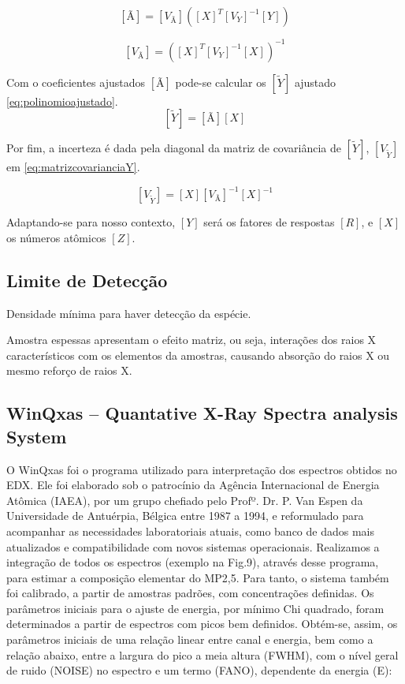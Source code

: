 \begin{equation}
  \label{eq:coeficientesajustados}
  [Ã] = [V_{Ã}] ([X]^T {[V_Y]}^{-1} [Y])
\end{equation}

\begin{equation}
  \label{eq:matrizcovariancia}
  [V_{Ã}] = ([X]^T [V_Y]^{-1} [X])^{-1}
\end{equation}

Com o coeficientes ajustados $[Ã]$ pode-se calcular os $[\tilde{Y}]$ ajustado \ref{eq:polinomioajustado}.
\begin{equation}
  \label{eq:polinomioajustado}
  [\tilde{Y}] = [Ã][X]
\end{equation}

Por fim, a incerteza é dada pela diagonal da matriz de covariância de $[\tilde{Y}]$, 
$[V_{\tilde{Y}}]$ em \ref{eq:matrizcovarianciaY}.

\begin{equation}
  \label{eq:matrizcovarianciaY}
  [V_{\tilde{Y}}] = [X] [V_{Ã}]^{-1} [X]^{-1}
\end{equation}

Adaptando-se para nosso contexto, $[Y]$ será os fatores de respostas $[R]$,
e $[X]$ os números atômicos $[Z]$.

\subsection{Limite de Detecção}

Densidade mínima para haver detecção da espécie. %

Amostra espessas apresentam o efeito matriz, ou seja, interações dos 
raios X característicos com os elementos da amostras, causando 
absorção do raios X ou mesmo reforço de raios X.


\subsection{WinQxas – Quantative X-Ray Spectra analysis System}

O WinQxas foi o programa utilizado para interpretação dos espectros obtidos no EDX. Ele foi elaborado sob o patrocínio da Agência Internacional de Energia Atômica (IAEA), por um grupo chefiado pelo Profº. Dr. P. Van Espen da Universidade de Antuérpia, Bélgica entre 1987 a 1994, e reformulado para acompanhar as necessidades laboratoriais atuais, como banco de dados mais atualizados e compatibilidade com novos sistemas operacionais. 
Realizamos a integração de todos os espectros (exemplo na Fig.9), através desse programa, para estimar a composição elementar do MP2,5. Para tanto, o sistema também foi  calibrado, a partir de amostras padrões, com concentrações definidas. Os parâmetros iniciais para o ajuste de energia, por mínimo Chi quadrado, foram determinados  a partir de espectros com picos bem definidos. Obtém-se, assim, os parâmetros iniciais de uma relação linear entre canal e energia, bem como a relação abaixo, entre a largura do pico a meia altura (FWHM), com o nível geral de ruido (NOISE)  no espectro e um termo (FANO), dependente da energia (E):

